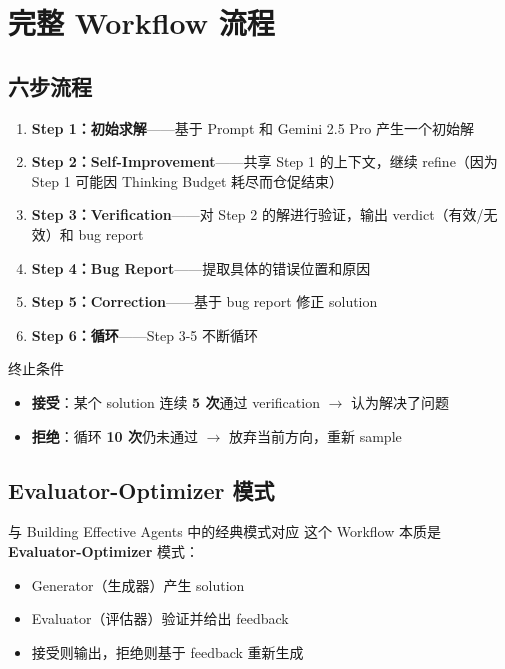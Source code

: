 \section{完整 Workflow 流程}

\subsection{六步流程}

\begin{enumerate}
    \item \textbf{Step 1：初始求解}——基于 Prompt 和 Gemini 2.5 Pro 产生一个初始解
    \item \textbf{Step 2：Self-Improvement}——共享 Step 1 的上下文，继续 refine（因为 Step 1 可能因 Thinking Budget 耗尽而仓促结束）
    \item \textbf{Step 3：Verification}——对 Step 2 的解进行验证，输出 verdict（有效/无效）和 bug report
    \item \textbf{Step 4：Bug Report}——提取具体的错误位置和原因
    \item \textbf{Step 5：Correction}——基于 bug report 修正 solution
    \item \textbf{Step 6：循环}——Step 3-5 不断循环
\end{enumerate}

\begin{importantbox}{终止条件}
\begin{itemize}
    \item \textbf{接受}：某个 solution 连续 \textbf{5 次}通过 verification $\rightarrow$ 认为解决了问题
    \item \textbf{拒绝}：循环 \textbf{10 次}仍未通过 $\rightarrow$ 放弃当前方向，重新 sample
\end{itemize}
\end{importantbox}

\subsection{Evaluator-Optimizer 模式}

\begin{knowledgebox}{与 Building Effective Agents 中的经典模式对应}
这个 Workflow 本质是 \textbf{Evaluator-Optimizer} 模式：
\begin{itemize}
    \item Generator（生成器）产生 solution
    \item Evaluator（评估器）验证并给出 feedback
    \item 接受则输出，拒绝则基于 feedback 重新生成
\end{itemize}
\end{knowledgebox}

